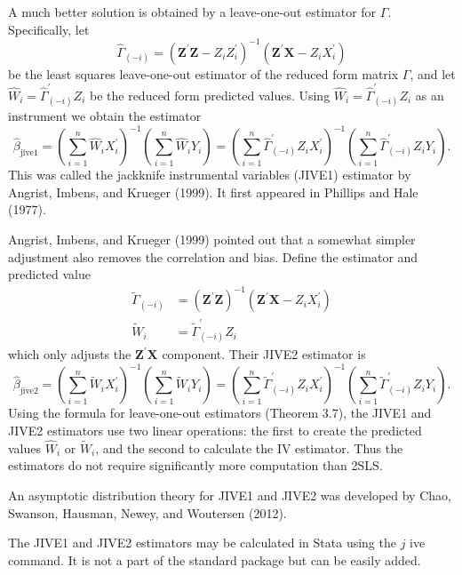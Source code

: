 \documentclass[10pt]{article}
\begin{document}
A much better solution is obtained by a leave-one-out estimator for $\Gamma$. Specifically, let
$$
\widehat{\Gamma}_{(-i)}=\left(\boldsymbol{Z}^{\prime} \boldsymbol{Z}-Z_{i} Z_{i}^{\prime}\right)^{-1}\left(\boldsymbol{Z}^{\prime} \boldsymbol{X}-Z_{i} X_{i}^{\prime}\right)
$$
be the least squares leave-one-out estimator of the reduced form matrix $\Gamma$, and let $\widehat{W}_{i}=\widehat{\Gamma}_{(-i)}^{\prime} Z_{i}$ be the reduced form predicted values. Using $\widehat{W}_{i}=\widehat{\Gamma}_{(-i)}^{\prime} Z_{i}$ as an instrument we obtain the estimator
$$
\widehat{\beta}_{\mathrm{jive1}}=\left(\sum_{i=1}^{n} \widehat{W}_{i} X_{i}^{\prime}\right)^{-1}\left(\sum_{i=1}^{n} \widehat{W}_{i} Y_{i}\right)=\left(\sum_{i=1}^{n} \widehat{\Gamma}_{(-i)}^{\prime} Z_{i} X_{i}^{\prime}\right)^{-1}\left(\sum_{i=1}^{n} \widehat{\Gamma}_{(-i)}^{\prime} Z_{i} Y_{i}\right) .
$$
This was called the jackknife instrumental variables (JIVE1) estimator by Angrist, Imbens, and Krueger (1999). It first appeared in Phillips and Hale (1977).

Angrist, Imbens, and Krueger (1999) pointed out that a somewhat simpler adjustment also removes the correlation and bias. Define the estimator and predicted value
$$
\begin{aligned}
\widetilde{\Gamma}_{(-i)} &=\left(\boldsymbol{Z}^{\prime} \boldsymbol{Z}\right)^{-1}\left(\boldsymbol{Z}^{\prime} \boldsymbol{X}-Z_{i} X_{i}^{\prime}\right) \\
\widetilde{W}_{i} &=\widetilde{\Gamma}_{(-i)}^{\prime} Z_{i}
\end{aligned}
$$
which only adjusts the $\boldsymbol{Z}^{\prime} \boldsymbol{X}$ component. Their JIVE2 estimator is
$$
\widehat{\beta}_{\mathrm{jive} 2}=\left(\sum_{i=1}^{n} \widetilde{W}_{i} X_{i}^{\prime}\right)^{-1}\left(\sum_{i=1}^{n} \widetilde{W}_{i} Y_{i}\right)=\left(\sum_{i=1}^{n} \widetilde{\Gamma}_{(-i)}^{\prime} Z_{i} X_{i}^{\prime}\right)^{-1}\left(\sum_{i=1}^{n} \widetilde{\Gamma}_{(-i)}^{\prime} Z_{i} Y_{i}\right) .
$$
Using the formula for leave-one-out estimators (Theorem 3.7), the JIVE1 and JIVE2 estimators use two linear operations: the first to create the predicted values $\widehat{W}_{i}$ or $\widetilde{W}_{i}$, and the second to calculate the IV estimator. Thus the estimators do not require significantly more computation than 2SLS.

An asymptotic distribution theory for JIVE1 and JIVE2 was developed by Chao, Swanson, Hausman, Newey, and Woutersen (2012).

The JIVE1 and JIVE2 estimators may be calculated in Stata using the $j$ ive command. It is not a part of the standard package but can be easily added.
\end{document}
